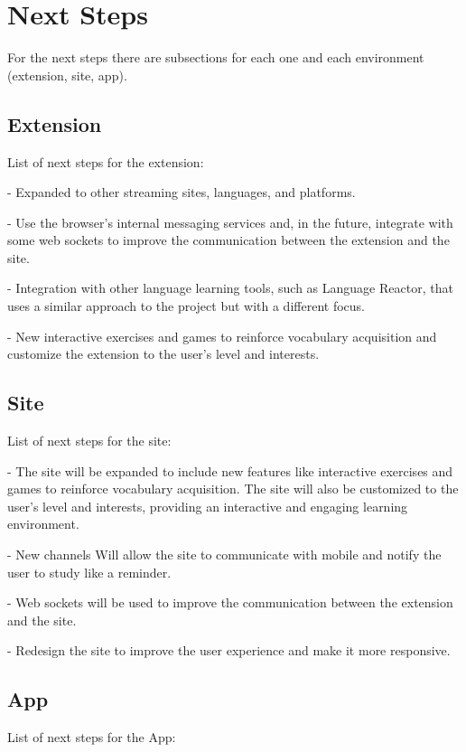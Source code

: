 \documentclass[12pt]{article}
\begin{document}
\section{Next Steps}

For the next steps there are subsections for each one and each environment (extension, site, app).

\subsection{Extension}

List of next steps for the extension:

- Expanded to other streaming sites, languages, and platforms. 

- Use the browser's internal messaging services and, in the future, integrate with some web sockets to improve the communication between the extension and the site. 

- Integration with other language learning tools, such as Language Reactor, that uses a similar approach to the project but with a different focus. 

- New interactive exercises and games to reinforce vocabulary acquisition and customize the extension to the user's level and interests.

\subsection{Site}

List of next steps for the site:

- The site will be expanded to include new features like interactive exercises and games to reinforce vocabulary acquisition. The site will also be customized to the user's level and interests, providing an interactive and engaging learning environment. 

- New channels Will allow the site to communicate with mobile and notify the user to study like a reminder. 

- Web sockets will be used to improve the communication between the extension and the site.

- Redesign the site to improve the user experience and make it more responsive.

\subsection{App}

List of next steps for the App:
\end{document}
